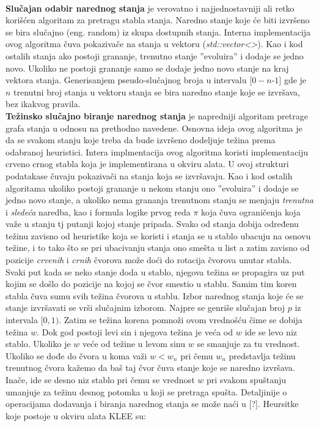 \documentclass[12pt]{article}
\begin{document}
\\
\textbf{Slučajan odabir narednog stanja} je verovatno i najjednostavniji ali retko korišćen algoritam za pretragu stabla stanja. Naredno stanje koje će biti izvršeno se bira slučajno (eng. random) iz skupa dostupnih stanja. Interna implementacija ovog algoritma čuva pokazivače na stanja u vektoru (\textit{std::vector<>}). Kao i kod ostalih stanja ako postoji grananje, trenutno stanje ''evoluira'' i dodaje se jedno novo. Ukoliko ne postoji grananje samo se dodaje jedno novo stanje na kraj vektora stanja. Generisanjem pseudo-slučajnog broja u intervalu $[0 - n $-$ 1]$ gde je $n$ trenutni broj stanja u vektoru stanja se bira naredno stanje koje se izvršava, bez ikakvog pravila.\newline
\\
\textbf{Težinsko slučajno biranje narednog stanja} je napredniji algoritam pretrage grafa stanja u odnosu na prethodno navedene. Osnovna ideja ovog algoritma je da se svakom stanju koje treba da bude izvršeno dodeljuje težina prema odabranoj heuristici. Intera implmentacija ovog algoritma koristi implementaciju crveno crnog stabla koja je implementirana u okviru alata. U ovoj strukturi podatakase čuvaju pokazivači na stanja koja se izvršavaju. Kao i kod ostalih algoritama ukoliko postoji grananje u nekom stanju ono ''evoluira'' i dodaje se jedno novo stanje, a ukoliko nema grananja trenutnom stanju se menjaju \textit{trenutna} i \textit{sledeća} naredba, kao i formula logike prvog reda $\pi$ koja čuva ograničenja koja važe u stanju tj putanji kojoj stanje pripada. Svako od stanja dobija određenu težinu zavisno od heuristike koja se koristi i stanja se u stablo ubacuju na osnovu težine, i to tako što se pri ubacivanju stanja ono smešta u list a zatim zavisno od pozicije \textit{crvenih} i \textit{crnih} čvorova može doći do rotacija čvorova unutar stabla. Svaki put kada se neko stanje doda u stablo, njegova težina se propagira uz put kojim se došlo do pozicije na kojoj se čvor smestio u stablu. Samim tim koren stabla čuva sumu svih težina čvorova u stablu. Izbor narednog stanja koje će se stanje izvršavati se vrši slučajnim izborom. Najpre se genriše slučajan broj $p$ iz intervala $[0, 1)$. Zatim se težina korena pomnoži ovom vrednošću čime se dobija težina $w$. Dok god postoji levi sin i njegova težina je veća od $w$ ide se levo niz stablo. Ukoliko je $w$ veće od težine u levom sinu $w$ se smanjuje za tu vrednost. Ukoliko se dođe do čvora u koma važi $w < w_n$ pri čemu $w_n$ predstavlja težinu trenutnog čvora kažemo da baš taj čvor čuva stanje koje se naredno izvršava. Inače, ide se desno niz stablo pri čemu se vrednost $w$ pri svakom spuštanju umanjuje za težinu desnog potomka u koji se pretraga spušta. Detaljinije o operacijama dodavanja i biranja narednog stanja se može naći u [?]. Heursitke koje postoje u okviru alata KLEE su:
\end{document}

